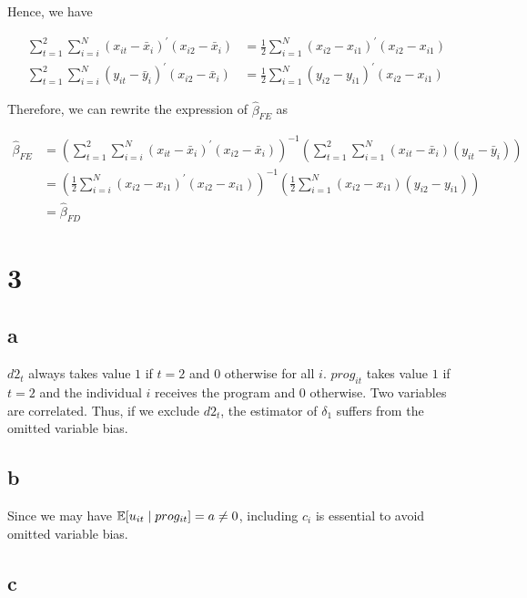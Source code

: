 \documentclass[11pt]{article}
\begin{document}
Hence, we have

\begin{align*}
    \sum_{t=1}^{2}\sum_{i=i}^{N} (x_{it} - \bar{x}_{i})^\prime (x_{i2} - \bar{x}_{i})
    &= \frac{1}{2} \sum_{i=1}^{N} (x_{i2} - x_{i1})^\prime (x_{i2} - x_{i1}) \\
    \sum_{t=1}^{2}\sum_{i=i}^{N} (y_{it} - \bar{y}_{i})^\prime (x_{i2} - \bar{x}_{i})
    &= \frac{1}{2} \sum_{i=1}^{N} (y_{i2} - y_{i1})^\prime (x_{i2} - x_{i1})
\end{align*}

Therefore, we can rewrite the expression of $\hat{\beta}_{FE}$ as

\begin{align*}
    \hat{\beta}_{FE}
    &= \left( \sum_{t=1}^{2}\sum_{i=i}^{N} (x_{it} - \bar{x}_{i})^\prime (x_{i2} - \bar{x}_{i}) \right)^{-1} \left( \sum_{t=1}^{2}\sum_{i=1}^{N} (x_{it} - \bar{x}_i) (y_{it} - \bar{y}_{i}) \right) \\
    &= \left( \frac{1}{2} \sum_{i=i}^{N} (x_{i2} - x_{i1})^\prime (x_{i2} - x_{i1}) \right)^{-1} \left( \frac{1}{2} \sum_{i=1}^{N} (x_{i2} - x_{i1}) (y_{i2} - y_{i1}) \right) \\
    &= \hat{\beta}_{FD}
\end{align*}


\section*{3}
\subsection*{a}

$d2_t$ always takes value $1$ if $t = 2$ and $0$ otherwise for all $i$. $prog_{it}$ takes value $1$ if $t = 2$ and the individual $i$ receives the program and $0$ otherwise. Two variables are correlated. Thus, if we exclude $d2_t$, the estimator of $\delta_1$ suffers from the omitted variable bias.

\subsection*{b}

Since we may have $\mathbb{E}[u_{it} \mid prog_{it}] = a \neq 0$, including $c_i$ is essential to avoid omitted variable bias.

\subsection*{c}
\end{document}
